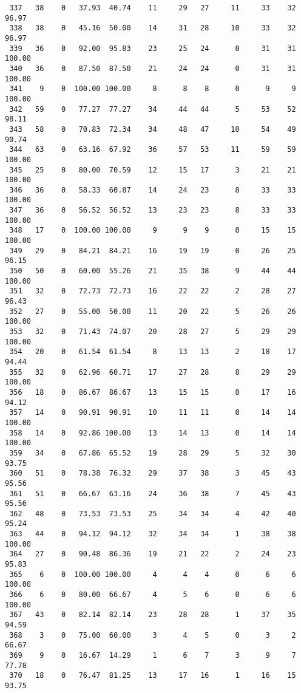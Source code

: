 \begin{verbatim}
 337   38    0   37.93  40.74    11     29   27     11     33    32    96.97
 338   38    0   45.16  50.00    14     31   28     10     33    32    96.97
 339   36    0   92.00  95.83    23     25   24      0     31    31   100.00
 340   36    0   87.50  87.50    21     24   24      0     31    31   100.00
 341    9    0  100.00 100.00     8      8    8      0      9     9   100.00
 342   59    0   77.27  77.27    34     44   44      5     53    52    98.11
 343   58    0   70.83  72.34    34     48   47     10     54    49    90.74
 344   63    0   63.16  67.92    36     57   53     11     59    59   100.00
 345   25    0   80.00  70.59    12     15   17      3     21    21   100.00
 346   36    0   58.33  60.87    14     24   23      8     33    33   100.00
 347   36    0   56.52  56.52    13     23   23      8     33    33   100.00
 348   17    0  100.00 100.00     9      9    9      0     15    15   100.00
 349   29    0   84.21  84.21    16     19   19      0     26    25    96.15
 350   50    0   60.00  55.26    21     35   38      9     44    44   100.00
 351   32    0   72.73  72.73    16     22   22      2     28    27    96.43
 352   27    0   55.00  50.00    11     20   22      5     26    26   100.00
 353   32    0   71.43  74.07    20     28   27      5     29    29   100.00
 354   20    0   61.54  61.54     8     13   13      2     18    17    94.44
 355   32    0   62.96  60.71    17     27   28      8     29    29   100.00
 356   18    0   86.67  86.67    13     15   15      0     17    16    94.12
 357   14    0   90.91  90.91    10     11   11      0     14    14   100.00
 358   14    0   92.86 100.00    13     14   13      0     14    14   100.00
 359   34    0   67.86  65.52    19     28   29      5     32    30    93.75
 360   51    0   78.38  76.32    29     37   38      3     45    43    95.56
 361   51    0   66.67  63.16    24     36   38      7     45    43    95.56
 362   48    0   73.53  73.53    25     34   34      4     42    40    95.24
 363   44    0   94.12  94.12    32     34   34      1     38    38   100.00
 364   27    0   90.48  86.36    19     21   22      2     24    23    95.83
 365    6    0  100.00 100.00     4      4    4      0      6     6   100.00
 366    6    0   80.00  66.67     4      5    6      0      6     6   100.00
 367   43    0   82.14  82.14    23     28   28      1     37    35    94.59
 368    3    0   75.00  60.00     3      4    5      0      3     2    66.67
 369    9    0   16.67  14.29     1      6    7      3      9     7    77.78
 370   18    0   76.47  81.25    13     17   16      1     16    15    93.75

\end{verbatim}
